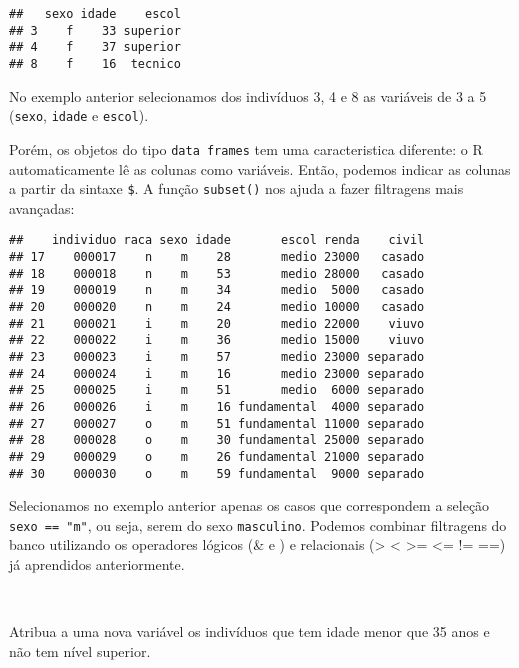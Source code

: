 \documentclass[]{book}
\newenvironment{Shaded}{\begin{snugshade}}{\end{snugshade}}
\newcommand{\KeywordTok}[1]{\textcolor[rgb]{0.13,0.29,0.53}{\textbf{#1}}}
\newcommand{\NormalTok}[1]{#1}
\newcommand{\OperatorTok}[1]{\textcolor[rgb]{0.81,0.36,0.00}{\textbf{#1}}}
\newcommand{\StringTok}[1]{\textcolor[rgb]{0.31,0.60,0.02}{#1}}
\theoremstyle{definition}
\theoremstyle{definition}
\theoremstyle{definition}
\theoremstyle{remark}
\let\BeginKnitrBlock\begin \let\EndKnitrBlock\end
\begin{document}
\begin{verbatim}
##   sexo idade    escol
## 3    f    33 superior
## 4    f    37 superior
## 8    f    16  tecnico
\end{verbatim}

No exemplo anterior selecionamos dos indivíduos 3, 4 e 8 as variáveis de 3 a 5 (\texttt{sexo}, \texttt{idade} e \texttt{escol}).

Porém, os objetos do tipo \texttt{data\ frames} tem uma caracteristica diferente: o R automaticamente lê as colunas como variáveis. Então, podemos indicar as colunas a partir da sintaxe \texttt{\$}. A função \texttt{subset()} nos ajuda a fazer filtragens mais avançadas:

\begin{Shaded}
\end{Shaded}

\begin{verbatim}
##    individuo raca sexo idade       escol renda    civil
## 17    000017    n    m    28       medio 23000   casado
## 18    000018    n    m    53       medio 28000   casado
## 19    000019    n    m    34       medio  5000   casado
## 20    000020    n    m    24       medio 10000   casado
## 21    000021    i    m    20       medio 22000    viuvo
## 22    000022    i    m    36       medio 15000    viuvo
## 23    000023    i    m    57       medio 23000 separado
## 24    000024    i    m    16       medio 23000 separado
## 25    000025    i    m    51       medio  6000 separado
## 26    000026    i    m    16 fundamental  4000 separado
## 27    000027    o    m    51 fundamental 11000 separado
## 28    000028    o    m    30 fundamental 25000 separado
## 29    000029    o    m    26 fundamental 21000 separado
## 30    000030    o    m    59 fundamental  9000 separado
\end{verbatim}

Selecionamos no exemplo anterior apenas os casos que correspondem a seleção \texttt{sexo\ ==\ "m"}, ou seja, serem do sexo \texttt{masculino}. Podemos combinar filtragens do banco utilizando os operadores lógicos (\& e \textbar{}) e relacionais (\textgreater{} \textless{} \textgreater{}= \textless{}= != ==) já aprendidos anteriormente.

~
\BeginKnitrBlock{exercise}
\protect\hypertarget{exr:unnamed-chunk-78}{}{\label{exr:unnamed-chunk-78} }Atribua a uma nova variável os indivíduos que tem idade menor que 35 anos e não tem nível superior.
\EndKnitrBlock{exercise}
\end{document}
